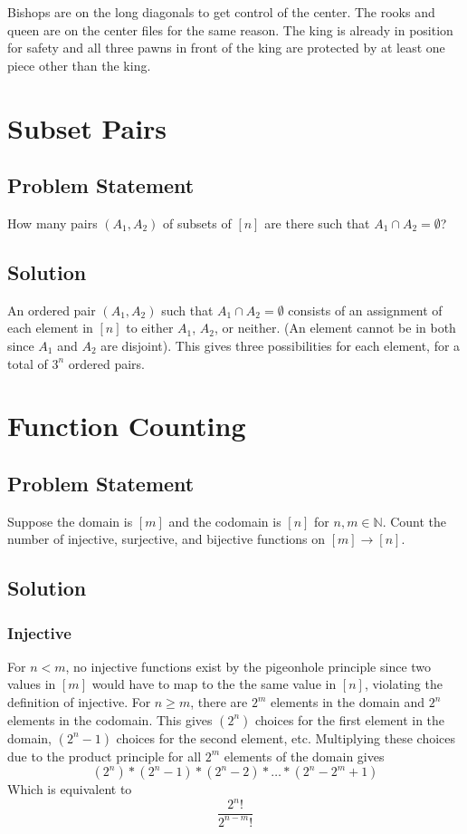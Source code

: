 \documentclass[12pt]{article}
\begin{document}
    \begin{center}
    \showboard
    \end{center}
    
    Bishops are on the long diagonals to get control of the center. The rooks and queen are on the center files for the same reason. The king is already in  position for safety and all three pawns in front of the king are protected by at least one piece other than the king.
    
    

\section{Subset Pairs}
\subsection*{Problem Statement}
How many pairs $(A_1, A_2)$ of subsets of $[n]$ are there such that $A_1 \cap A_2 = \emptyset$?
\subsection*{Solution}
An ordered pair $(A_1, A_2)$ such that $A_1 \cap A_2 = \emptyset$ consists of an assignment of each element in $[n]$ to either $A_1$, $A_2$, or neither. (An element cannot be in both since $A_1$ and $A_2$ are disjoint). This gives three possibilities for each element, for a total of $3^n$ ordered pairs.

\section{Function Counting}
\subsection*{Problem Statement}
Suppose the domain is $[m]$ and the codomain is $[n]$ for $n,m \in \mathbb{N}$. Count the number of injective, surjective, and bijective functions on $[m] \rightarrow [n]$.
\subsection*{Solution}
\subsubsection*{Injective}

For $n < m$, no injective functions exist by the pigeonhole principle since two values in $[m]$ would have to  map to the the same value in $[n]$, violating the definition of injective. For $n \geq m$, there are $2^m$ elements in the domain and $2^n$ elements in the codomain. This gives $(2^{n})$ choices for the first element in the domain, $(2^{n}-1)$ choices for the second element, etc. Multiplying these choices due to the product principle for all $2^{m}$ elements of the domain gives 
    $$(2^{n}) * (2^{n}-1) * (2^{n}-2) * \ldots * (2^{n} - 2^m + 1)$$
    Which is equivalent to $$\frac{2^n!}{2^{n-m}!}$$
    
\end{document}
